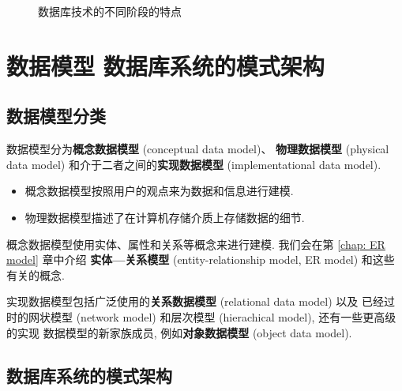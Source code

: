 \documentclass[10pt,UTF8]{book} %
\begin{document}
\begin{figure}[H]
\begin{minipage}{\textwidth}
    \end{minipage}
    \caption{数据库技术的不同阶段的特点}
\end{figure}

\section{数据模型 \quad 数据库系统的模式架构}

\subsection{数据模型分类}

数据模型分为\textbf{概念数据模型} (conceptual data model)、
\textbf{物理数据模型} (physical data model) 和介于二者之间的\textbf{实现数据模型}
(implementational data model).
\begin{itemize}[itemsep=0pt]
    \item 概念数据模型按照用户的观点来为数据和信息进行建模.
    \item 物理数据模型描述了在计算机存储介质上存储数据的细节.
\end{itemize}

概念数据模型使用实体、属性和关系等概念来进行建模. 我们会在第 \ref{chap: ER model} 章中介绍
\textbf{实体—关系模型} (entity-relationship model, ER model) 和这些有关的概念.

实现数据模型包括广泛使用的\textbf{关系数据模型} (relational data model) 以及
已经过时的网状模型 (network model) 和层次模型 (hierachical model), 还有一些更高级的实现
数据模型的新家族成员, 例如\textbf{对象数据模型} (object data model).

\subsection{数据库系统的模式架构}
\end{document}
